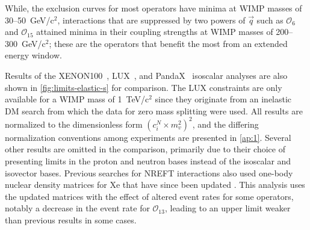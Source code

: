 \documentclass[reprint, showpacs,
preprintnumbers,
amsmath,amssymb,
aps, floatfix,
superscriptaddress,
prd, nofootinbib]{revtex4-1}
\begin{document}
While, the exclusion curves for most operators have minima at WIMP masses of 30--50~GeV/c$^2$, interactions that are suppressed by two powers of $\vec{q}$ such as $\mathcal{O}_6$ and $\mathcal{O}_{15}$ attained minima in their coupling strengths at WIMP masses of 200--300~GeV/c$^2$; these are the operators that benefit the most from an extended energy window.
\par
Results of the XENON100~\cite{Xenon100:EFT_2017}, LUX~\cite{LUX:EFTR4_2021}, and PandaX~\cite{PandaX2:SD_EFT_2019} isoscalar analyses are also shown in \autoref{fig:limits-elastic-s} for comparison. 
The LUX constraints are only available for a WIMP mass of 1~TeV/c$^2$ since they originate from an inelastic DM search from which the data for zero mass splitting were used.
All results are normalized to the dimensionless form $(c_i^N \times m_v^2)^2$, and the differing normalization conventions among experiments are presented in \cref{ap:1}. 
Several other results are omitted in the comparison, primarily due to their choice of presenting limits in the proton and neutron bases instead of the isoscalar and isovector bases.
Previous searches for NREFT interactions also used one-body nuclear density matrices for Xe that have since been updated \cite{Haxton_OneBody}. 
This analysis uses the updated matrices with the effect of altered event rates for some operators, notably a decrease in the event rate for $\mathcal{O}_{13}$, leading to an upper limit weaker than previous results in some cases. 
\end{document}
